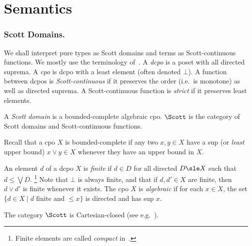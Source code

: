 \section{Semantics}
\label{sec:sem}


\subsubsection{Scott Domains.}
\label{sec:scott}
We shall interpret pure types as Scott domains and terms as Scott-continuous functions.
We mostly use the terminology of~\cite[\S 1]{ac98book}.
A \emph{dcpo} is a poset with all directed suprema.
A \emph{cpo} is dcpo with a least element (often denoted $\bot$).
A function between dcpos is \emph{Scott-continuous}
if it preserves the order (i.e.\ is monotone) as well as directed suprema.
A Scott-continuous function is \emph{strict} if it preserves
least elements.

\begin{definition}
\label{def:scott}
A \emph{Scott domain} is a bounded-complete algebraic cpo.
%
$\Scott$ is the category of Scott domains and Scott-continuous functions.
\end{definition}

Recall that a cpo $X$ is bounded-complete if
any two $x,y \in X$ have a sup (or \emph{least} upper bound)
$x \vee y \in X$ whenever they have an upper bound in $X$.

An element $d$ of a dcpo $X$ is \emph{finite}
if $d \in D$ for all directed $D \sle X$ such that
$d \leq \bigvee D$.%
\footnote{Finite elements are called \emph{compact}
in~\cite{ac98book}.}
Note that $\bot$ is always finite,
and that if $d,d' \in X$ are finite,
then $d \vee d'$ is finite whenever it exists.
%
The cpo $X$ is \emph{algebraic} if for each $x \in X$,
the set $\{ d\in X \mid \text{$d$ finite and $\leq x$} \}$
is directed and has sup $x$.

The category $\Scott$ is Cartesian-closed
(see e.g.\ \cite[Corollary 4.1.6]{aj95chapter}).

